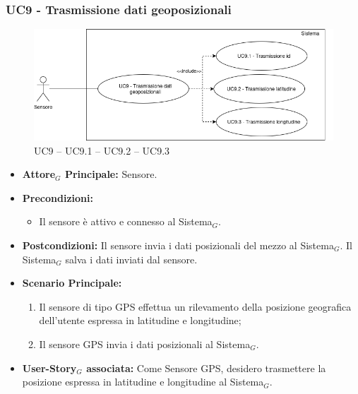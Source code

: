 \documentclass[10pt]{article}
\begin{document}
\begin{justify}
\subsubsection{\textbf{UC9 - Trasmissione dati geoposizionali}}
\begin{figure}[H]
    \centering
    \includegraphics[width=0.7\linewidth]{UC9image.png}
    \caption{UC9 -- UC9.1 -- UC9.2 -- UC9.3}
    \label{fig:UC9}
\end{figure}
\label{UC9}
\begin{itemize}
    \item \textbf{Attore$_G$ Principale:} Sensore.
    \item \textbf{Precondizioni:} 
        \begin{itemize}
    	\item Il sensore è attivo e connesso al Sistema$_G$.
        \end{itemize}
    \item \textbf{Postcondizioni:} Il sensore invia i dati posizionali del mezzo al Sistema$_G$. Il Sistema$_G$ salva i dati inviati dal sensore. 
    \item \textbf{Scenario Principale:} 
        \begin{enumerate}
            \item Il sensore di tipo GPS effettua un rilevamento della posizione geografica dell'utente espressa in latitudine e longitudine;
            \item Il sensore GPS invia i dati posizionali al Sistema$_G$.
        \end{enumerate}
    \item \textbf{User-Story$_G$ associata:} Come Sensore GPS, desidero trasmettere la posizione espressa in latitudine e longitudine al Sistema$_G$.
\end{itemize}

\end{justify}
\end{document}
